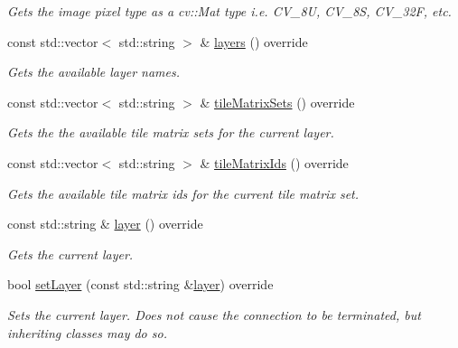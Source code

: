 \begin{DoxyCompactItemize}
\begin{DoxyCompactList}\small\item\em Gets the image pixel type as a cv\+::\+Mat type i.\+e. C\+V\+\_\+8U, C\+V\+\_\+8S, C\+V\+\_\+32F, etc. \end{DoxyCompactList}\item 
const std\+::vector$<$ std\+::string $>$ \& \hyperlink{classdg_1_1deepcore_1_1imagery_1_1_wmts_client_aadea619994a1fba8c8ed51894381a234}{layers} () override
\begin{DoxyCompactList}\small\item\em Gets the available layer names. \end{DoxyCompactList}\item 
const std\+::vector$<$ std\+::string $>$ \& \hyperlink{classdg_1_1deepcore_1_1imagery_1_1_wmts_client_aaeb1a41ceda072c0f11b33bdd3cf819e}{tile\+Matrix\+Sets} () override
\begin{DoxyCompactList}\small\item\em Gets the the available tile matrix sets for the current layer. \end{DoxyCompactList}\item 
const std\+::vector$<$ std\+::string $>$ \& \hyperlink{classdg_1_1deepcore_1_1imagery_1_1_wmts_client_ab71e17f8fd1c50c2aa64171c7e4c5f8a}{tile\+Matrix\+Ids} () override
\begin{DoxyCompactList}\small\item\em Gets the available tile matrix ids for the current tile matrix set. \end{DoxyCompactList}\item 
const std\+::string \& \hyperlink{classdg_1_1deepcore_1_1imagery_1_1_wmts_client_ab466d3b34f5b8558b4f1a5694b10496d}{layer} () override
\begin{DoxyCompactList}\small\item\em Gets the current layer. \end{DoxyCompactList}\item 
bool \hyperlink{classdg_1_1deepcore_1_1imagery_1_1_wmts_client_a61d18f8e719b505c0f0a6d21e4711c6d}{set\+Layer} (const std\+::string \&\hyperlink{classdg_1_1deepcore_1_1imagery_1_1_wmts_client_ab466d3b34f5b8558b4f1a5694b10496d}{layer}) override
\begin{DoxyCompactList}\small\item\em Sets the current layer. Does not cause the connection to be terminated, but inheriting classes may do so. \end{DoxyCompactList}\item 

\end{DoxyCompactItemize}
